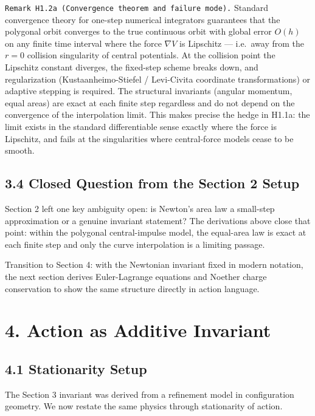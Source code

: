 \documentclass[
]{article}
\begin{document}
\texttt{Remark\ H1.2a\ (Convergence\ theorem\ and\ failure\ mode).}
Standard convergence theory for one-step numerical integrators
guarantees that the polygonal orbit converges to the true continuous
orbit with global error \(O(h)\) on any finite time interval where the
force \(\nabla V\) is Lipschitz --- i.e.~away from the \(r=0\) collision
singularity of central potentials. At the collision point the Lipschitz
constant diverges, the fixed-step scheme breaks down, and regularization
(Kustaanheimo-Stiefel / Levi-Civita coordinate transformations) or
adaptive stepping is required. The structural invariants (angular
momentum, equal areas) are exact at each finite step regardless and do
not depend on the convergence of the interpolation limit. This makes
precise the hedge in H1.1a: the limit exists in the standard
differentiable sense exactly where the force is Lipschitz, and fails at
the singularities where central-force models cease to be smooth.

\hypertarget{closed-question-from-the-section-2-setup}{%
\subsection{3.4 Closed Question from the Section 2
Setup}\label{closed-question-from-the-section-2-setup}}

Section 2 left one key ambiguity open: is Newton's area law a small-step
approximation or a genuine invariant statement? The derivations above
close that point: within the polygonal central-impulse model, the
equal-area law is exact at each finite step and only the curve
interpolation is a limiting passage.

Transition to Section 4: with the Newtonian invariant fixed in modern
notation, the next section derives Euler-Lagrange equations and Noether
charge conservation to show the same structure directly in action
language.

\hypertarget{action-as-additive-invariant}{%
\section{4. Action as Additive
Invariant}\label{action-as-additive-invariant}}

\hypertarget{stationarity-setup}{%
\subsection{4.1 Stationarity Setup}\label{stationarity-setup}}

The Section 3 invariant was derived from a refinement model in
configuration geometry. We now restate the same physics through
stationarity of action.
\end{document}
